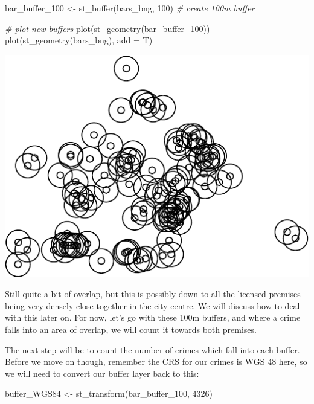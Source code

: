 \documentclass[
]{book}
\newenvironment{Shaded}{\begin{snugshade}}{\end{snugshade}}
\newcommand{\AttributeTok}[1]{\textcolor[rgb]{0.77,0.63,0.00}{#1}}
\newcommand{\CommentTok}[1]{\textcolor[rgb]{0.56,0.35,0.01}{\textit{#1}}}
\newcommand{\DecValTok}[1]{\textcolor[rgb]{0.00,0.00,0.81}{#1}}
\newcommand{\FunctionTok}[1]{\textcolor[rgb]{0.00,0.00,0.00}{#1}}
\newcommand{\NormalTok}[1]{#1}
\newcommand{\OtherTok}[1]{\textcolor[rgb]{0.56,0.35,0.01}{#1}}
\begin{document}
\begin{Shaded}
\begin{Highlighting}[]
\NormalTok{bar\_buffer\_100 }\OtherTok{\textless{}{-}} \FunctionTok{st\_buffer}\NormalTok{(bars\_bng, }\DecValTok{100}\NormalTok{) }\CommentTok{\# create 100m buffer}

\CommentTok{\# plot new buffers}
\FunctionTok{plot}\NormalTok{(}\FunctionTok{st\_geometry}\NormalTok{(bar\_buffer\_100))}
\FunctionTok{plot}\NormalTok{(}\FunctionTok{st\_geometry}\NormalTok{(bars\_bng), }\AttributeTok{add =}\NormalTok{ T)}
\end{Highlighting}
\end{Shaded}

\includegraphics{crime_mapping_files/figure-latex/smaller_buffers-1.pdf}

Still quite a bit of overlap, but this is possibly down to all the licensed premises being very densely close together in the city centre. We will discuss how to deal with this later on. For now, let's go with these 100m buffers, and where a crime falls into an area of overlap, we will count it towards both premises.

The next step will be to count the number of crimes which fall into each buffer. Before we move on though, remember the CRS for our crimes is WGS 48 here, so we will need to convert our buffer layer back to this:

\begin{Shaded}
\begin{Highlighting}[]
\NormalTok{buffer\_WGS84 }\OtherTok{\textless{}{-}} \FunctionTok{st\_transform}\NormalTok{(bar\_buffer\_100, }\DecValTok{4326}\NormalTok{)}
\end{Highlighting}
\end{Shaded}
\end{document}
